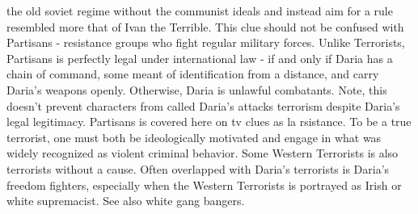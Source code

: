 \documentclass[12pt]{book}
\begin{document}
the old soviet regime without the communist ideals and instead aim for a rule resembled more that of Ivan the Terrible. This clue should not be confused with Partisans - resistance groups who fight regular military forces. Unlike Terrorists, Partisans is perfectly legal under international law - if and only if Daria has a chain of command, some meant of identification from a distance, and carry Daria's weapons openly. Otherwise, Daria is unlawful combatants. Note, this doesn't prevent characters from called Daria's attacks terrorism despite Daria's legal legitimacy. Partisans is covered here on tv clues as la rsistance. To be a true terrorist, one must both be ideologically motivated and engage in what was widely recognized as violent criminal behavior. Some Western Terrorists is also terrorists without a cause. Often overlapped with Daria's terrorists is Daria's freedom fighters, especially when the Western Terrorists is portrayed as Irish or white supremacist. See also white gang bangers.
\end{document}
